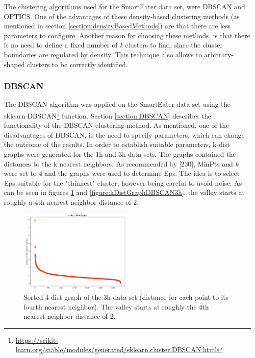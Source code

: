 The clustering algorithms used for the SmartEater data set, were DBSCAN and OPTICS. One of the advantages of these density-based clustering methods (as mentioned in section \ref{section:densityBasedMethods}) are that there are less parameters to configure. Another reason for choosing these methods, is that there is no need to define a fixed number of \textit{k} clusters to find, since the cluster boundaries are regulated by density. This technique also allows to arbitrary-shaped clusters to be correctly identified.

\subsubsection{DBSCAN}
The DBSCAN algorithm was applied on the SmartEater data set using the sklearn DBSCAN\footnote{\url{https://scikit-learn.org/stable/modules/generated/sklearn.cluster.DBSCAN.html}} function.
Section \ref{section:DBSCAN} describes the functionality of the DBSCAN clustering method. As mentioned, one of the disadvantages of DBSCAN, is the need to specify parameters, which can change the outcome of the results. In order to establish suitable parameters, k-dist graphs were generated for the 1h and 3h data sets. The graphs contained the distances to the k nearest neighbors. As recommended by \textcite{DBSCAN}[230], MinPts and \textit{k} were set to 4 and the graphs were used to determine Eps. The idea is to select Eps suitable for the "thinnest" cluster, however being careful to avoid noise. As can be seen in figures \ref{figure:kDistGraphDBSCAN1h} and \ref{figure:kDistGraphDBSCAN3h}, the valley starts at roughly a 4th nearest neighbor distance of 2. 

\begin{figure}[h]
  \centering
  \includegraphics[width=0.5\textwidth]{./images/kDistGraphDBSCAN1h.png}
  \caption{Sorted 4-dist graph of the 3h data set (distance for each point to its fourth nearest neighbor). The valley starts at roughly the 4th nearest neighbor distance of 2.}
  \label{figure:kDistGraphDBSCAN1h}
\end{figure}

